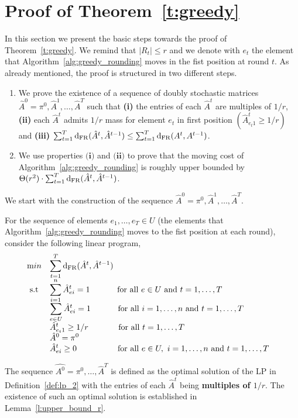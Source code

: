 \section{Proof of Theorem~\ref{t:greedy}}\label{s:greedy}
 \noindent In this section we present the basic steps towards the proof of Theorem~\ref{t:greedy}. We remind that $|R_t| \leq r$ and we denote with $e_t$ the element that Algorithm~\ref{alg:greedy_rounding} moves in the fist position at round $t$. As already mentioned, the proof is structured in two 
 different steps.
 \smallskip
 \begin{enumerate}
     \item We prove the existence of a sequence of doubly stochastic matrices $\hat{A}^0 = \pi^0,\hat{A}^1,\ldots,\hat{A}^T$ such that \textbf{(i)} the entries of each $\hat{A}^t$ are multiples of $1/r$, \textbf{(ii)} each $\hat{A}^t$ admits $1/r$ mass for element $e_t$ in first position $(\hat{A}^t_{e_t 1} \geq 1/r)$ and
     \textbf{(iii)}
     $\sum_{t=1}^T \mathrm{d}_{\mathrm{FR}}(\hat{A}^t,\hat{A}^{t-1}) \leq \sum_{t=1}^T \mathrm{d}_{\mathrm{FR}}(A^t,A^{t-1})$.\smallskip
     \item We use properties $\textbf{(i)}$ and $\textbf{(ii)}$ to prove that the moving cost of Algorithm~\ref{alg:greedy_rounding} is roughly upper bounded by $\Theta(r^2) \cdot \sum_{t=1}^T \mathrm{d}_{\mathrm{FR}}(\hat{A}^t,\hat{A}^{t-1})$.
 \end{enumerate}

\noindent We start with the construction of the sequence $\hat{A}^0=\pi^0,\hat{A}^1,\ldots,\hat{A}^T$.
\begin{definition}\label{def:lp_2}
For the sequence of elements $e_1,\ldots,e_T \in U$ (the elements that Algorithm~\ref{alg:greedy_rounding} moves to the fist position at each round), consider the following linear program,
\begin{equation*}
    \begin{array}{ll@{}ll}
        \text min & \displaystyle \sum_{t=1}^T \dfr(\hat{A}^t,\hat{A}^{t-1})&\\
        \text{ s.t } & \displaystyle \sum_{i=1}^{n} \hat{A}_{ei}^t = 1 ~~~~~~~~~~\text{for all } e \in U \text{ and } t = 1,\ldots, T  &&\\
        & \displaystyle \sum_{e \in U} \hat{A}_{ei}^t = 1
        ~~~~~~~~~~\text{for all } i = 1, \ldots, n \text{ and } t = 1, \ldots, T  &&\\
        & \displaystyle \hat{A}_{e_t1}^t \geq 1/r ~~~~~~~~~~~\text{for all } t = 1, \ldots, T&\\
        &\displaystyle \hat{A}^0 = \pi^0 &\\
        & \displaystyle\hat{A}_{ei}^t\geq 0~~~~~~~~~~~~~~~\text{for all } e \in U, ~i = 1,\ldots, n  \text{ and }t = 1,\ldots, T&\\
    \end{array}
\end{equation*}
\end{definition}
\noindent The sequence $\hat{A^0}=\pi^0,\ldots,\hat{A}^T$ is defined as the optimal solution of the LP in Definition~\ref{def:lp_2} with the entries of each $\hat{A}^t$ being \textbf{multiples of $1/r$}. The existence of such an optimal solution is established in Lemma~\ref{l:upper_bound_r}.   

